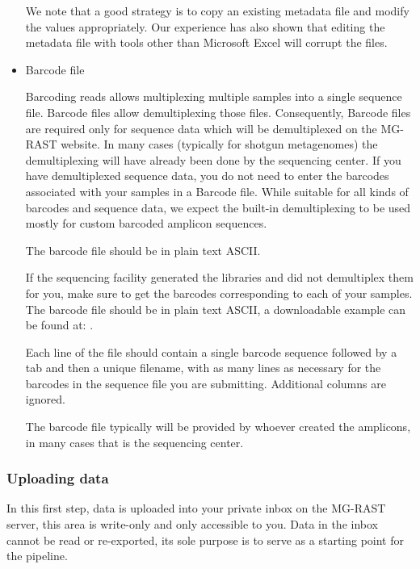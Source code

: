 \documentclass[letterpaper,10pt,english]{sphinxmanual}
\begin{document}
\begin{itemize}
We note that a good strategy is to copy an existing metadata file and
modify the values appropriately. Our experience has also shown that
editing the metadata file with tools other than Microsoft Excel will
corrupt the files.

\item {} 
Barcode file

Barcoding reads allows multiplexing multiple samples into a single
sequence file. Barcode files allow demultiplexing those files.
Consequently, Barcode files are required only for sequence data which
will be demultiplexed on the MG-RAST website. In many cases
(typically for shotgun metagenomes) the demultiplexing will have
already been done by the sequencing center. If you have demultiplexed
sequence data, you do not need to enter the barcodes associated with
your samples in a Barcode file. While suitable for all kinds of
barcodes and sequence data, we expect the built-in demultiplexing to
be used mostly for custom barcoded amplicon sequences.

The barcode file should be in plain text ASCII.

If the sequencing facility generated the libraries and did not
demultiplex them for you, make sure to get the barcodes corresponding
to each of your samples. The barcode file should be in plain text
ASCII, a downloadable example can be found at:
.

Each line of the file should contain a single barcode sequence
followed by a tab and then a unique filename, with as many lines as
necessary for the barcodes in the sequence file you are submitting.
Additional columns are ignored.

\begin{sphinxVerbatim}[commandchars=\\\{\}]
    
    
    
\end{sphinxVerbatim}

The barcode file typically will be provided by whoever created the
amplicons, in many cases that is the sequencing center.

\end{itemize}


\subsubsection{Uploading data}
\label{\detokenize{faq:uploading-data}}
In this first step, data is uploaded into your private inbox on the
MG-RAST server, this area is write-only and only accessible to you. Data
in the inbox cannot be read or re-exported, its sole purpose is to serve
as a starting point for the pipeline.
\end{document}
